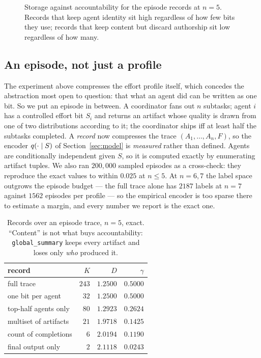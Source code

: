 \begin{figure}[t]
\centering
\resizebox{\columnwidth}{!}{}
\caption{Storage against accountability for the episode records at $n=5$.
Records that keep agent identity sit high regardless of how few bits they
use; records that keep content but discard authorship sit low regardless of
how many.}
\label{fig:identity}
\end{figure}
\subsection{An episode, not just a profile}
\label{app:episodes}

The experiment above compresses the effort profile itself, which concedes the
abstraction most open to question: that what an agent did can be written as one
bit. So we put an episode in between. A coordinator fans out $n$ subtasks; agent
$i$ has a controlled effort bit $S_i$ and returns an artifact whose quality is
drawn from one of two distributions according to it; the coordinator ships iff at
least half the subtasks completed. A \emph{record} now compresses the trace
$(A_1,\dots,A_n,F)$, so the encoder $q(\cdot \mid S)$ of
Section~\ref{sec:model} is \emph{measured} rather than defined. Agents are
conditionally independent given $S$, so it is computed exactly by enumerating
artifact tuples. We also ran $200{,}000$ sampled episodes as a cross-check:
they reproduce the exact values to within $0.025$ at $n \le 5$. At $n = 6,7$
the label space outgrows the episode budget --- the full trace alone has $2187$
labels at $n=7$ against $1562$ episodes per profile --- so the empirical
encoder is too sparse there to estimate a margin, and every number we report is
the exact one.

\begin{table}[t]
\centering
\caption{Records over an episode trace, $n = 5$, exact. ``Content'' is not what
buys accountability: \texttt{global\_summary} keeps every artifact and loses only
\emph{who} produced it.}
\label{tab:episodes}
\small
\begin{tabular}{@{}lrrr@{}}
\toprule
record & $K$ & $D$ & $\gamma$ \\
\midrule
full trace              & $243$ & $1.2500$ & $0.5000$ \\
one bit per agent       & $32$  & $1.2500$ & $0.5000$ \\
top-half agents only    & $80$  & $1.2923$ & $0.2624$ \\
multiset of artifacts   & $21$  & $1.9718$ & $0.1425$ \\
count of completions    & $6$   & $2.0194$ & $0.1190$ \\
final output only       & $2$   & $2.1118$ & $0.0243$ \\
\bottomrule
\end{tabular}
\end{table}

